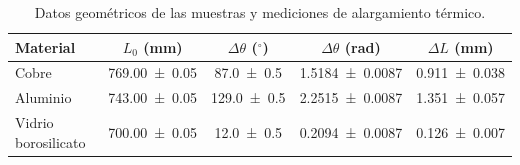     \begin{table}[H]
        \centering
        \caption{Datos geométricos de las muestras y mediciones de alargamiento térmico.}
        \label{tab:datos_dilatacion}
        \begin{tabular}{lcccc}
            \toprule
            \textbf{Material} & $L_0$ (mm) & $\Delta\theta$ ($^\circ$) & $\Delta\theta$ (rad) & $\Delta L$ (mm) \\
            \midrule
            Cobre & \num{769,00 \pm 0,05} & \num{87,0 \pm 0,5} & \num{1,5184 \pm 0,0087} & \num{0,911 \pm 0,038} \\
            Aluminio & \num{743,00 \pm 0,05} & \num{129,0 \pm 0,5} & \num{2,2515 \pm 0,0087} & \num{1,351 \pm 0,057} \\
            Vidrio borosilicato & \num{700,00 \pm 0,05} & \num{12,0 \pm 0,5} & \num{0,2094 \pm 0,0087} & \num{0,126 \pm 0,007} \\
            \bottomrule
        \end{tabular}
    \end{table}